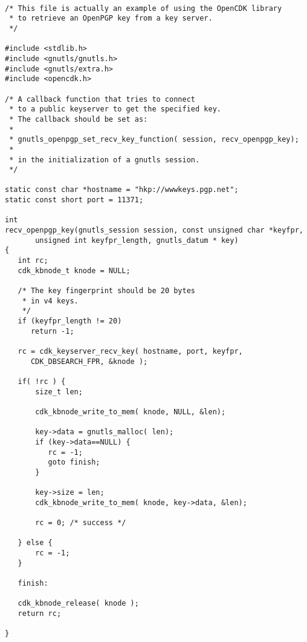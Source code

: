 \begin {verbatim}

/* This file is actually an example of using the OpenCDK library
 * to retrieve an OpenPGP key from a key server.
 */

#include <stdlib.h>
#include <gnutls/gnutls.h>
#include <gnutls/extra.h>
#include <opencdk.h>

/* A callback function that tries to connect
 * to a public keyserver to get the specified key.
 * The callback should be set as:
 *
 * gnutls_openpgp_set_recv_key_function( session, recv_openpgp_key);
 *
 * in the initialization of a gnutls session.
 */

static const char *hostname = "hkp://wwwkeys.pgp.net";
static const short port = 11371;

int
recv_openpgp_key(gnutls_session session, const unsigned char *keyfpr, 
       unsigned int keyfpr_length, gnutls_datum * key)
{
   int rc;
   cdk_kbnode_t knode = NULL;

   /* The key fingerprint should be 20 bytes
    * in v4 keys.
    */
   if (keyfpr_length != 20)
      return -1;

   rc = cdk_keyserver_recv_key( hostname, port, keyfpr, 
      CDK_DBSEARCH_FPR, &knode );

   if( !rc ) {
       size_t len;

       cdk_kbnode_write_to_mem( knode, NULL, &len);

       key->data = gnutls_malloc( len);
       if (key->data==NULL) {
          rc = -1;
          goto finish;
       }

       key->size = len;
       cdk_kbnode_write_to_mem( knode, key->data, &len);

       rc = 0; /* success */

   } else {
       rc = -1;
   }

   finish:

   cdk_kbnode_release( knode );
   return rc;

}


\end{verbatim}
